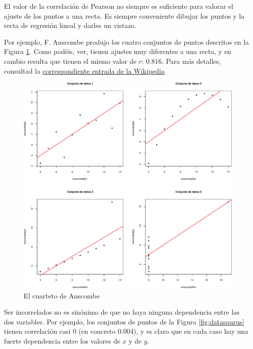 \documentclass[
]{book}
\theoremstyle{definition}
\theoremstyle{definition}
\theoremstyle{definition}
\theoremstyle{definition}
\theoremstyle{remark}
\begin{document}
\begin{rmdimportant}
El valor de la correlación de Pearson no siempre es suficiente para valorar el ajuste de los puntos a una recta. Es siempre conveniente dibujar los puntos y la recta de regresión lineal y darles un vistazo.
\end{rmdimportant}

Por ejemplo, F. Anscombe produjo los cuatro conjuntos de puntos descritos en la Figura \ref{fig:anscombe}. Como podéis, ver, tienen ajustes muy diferentes a una recta, y en cambio resulta que tienen el mismo valor de \(r\): 0.816. Para más detalles, consultad la \href{https://es.wikipedia.org/wiki/Cuarteto_de_Anscombe}{correspondiente entrada de la Wikipedia}

\begin{figure}

{\centering \includegraphics[width=0.9\linewidth]{INREMDN_files/figure-latex/anscombe-1} 

}

\caption{El cuarteto de Anscombe}\label{fig:anscombe}
\end{figure}

\begin{rmdnote}
Ser incorrelados no es sinónimo de que no haya ninguna dependencia entre las dos variables. Por ejemplo, los conjuntos de puntos de la Figura \ref{fig:datasaurus} tienen correlación casi 0 (en concreto 0.004), y es claro que en cada caso hay una fuerte dependencia entre los valores de \(x\) y de \(y\).
\end{rmdnote}
\end{document}
